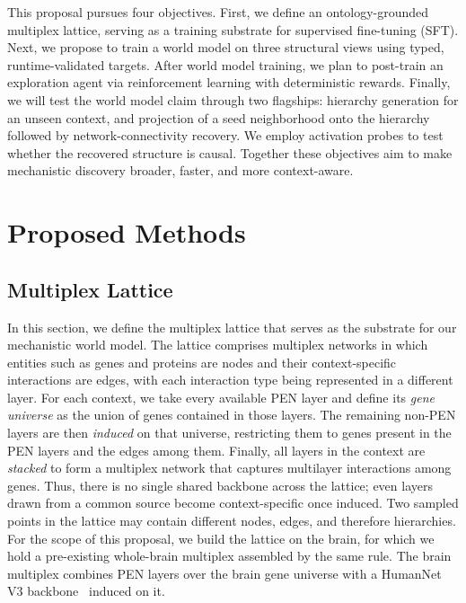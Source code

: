 This proposal pursues four objectives. First, we define an ontology-grounded multiplex lattice, serving as a training substrate for supervised fine-tuning (SFT). Next, we propose to train a world model on three structural views using typed, runtime-validated targets. After world model training, we plan to post-train an exploration agent via reinforcement learning with deterministic rewards. Finally, we will test the world model claim through two flagships: hierarchy generation for an unseen context, and projection of a seed neighborhood onto the hierarchy followed by network-connectivity recovery. We employ activation probes to test whether the recovered structure is causal. Together these objectives aim to make mechanistic discovery broader, faster, and more context-aware.

\section{Proposed Methods}
\subsection{Multiplex Lattice}\label{sec:ch4-lattice}
In this section, we define the multiplex lattice that serves as the substrate for our mechanistic world model. The lattice comprises multiplex networks in which entities such as genes and proteins are nodes and their context-specific interactions are edges, with each interaction type being represented in a different layer. For each context, we take every available PEN layer and define its \textit{gene universe} as the union of genes contained in those layers. The remaining non-PEN layers are then \textit{induced} on that universe, restricting them to genes present in the PEN layers and the edges among them. Finally, all layers in the context are \textit{stacked} to form a multiplex network that captures multilayer interactions among genes. Thus, there is no single shared backbone across the lattice; even layers drawn from a common source become context-specific once induced. Two sampled points in the lattice may contain different nodes, edges, and therefore hierarchies. For the scope of this proposal, we build the lattice on the brain, for which we hold a pre-existing whole-brain multiplex assembled by the same rule. The brain multiplex combines PEN layers over the brain gene universe with a HumanNet V3 backbone~\cite{humannet} induced on it.

